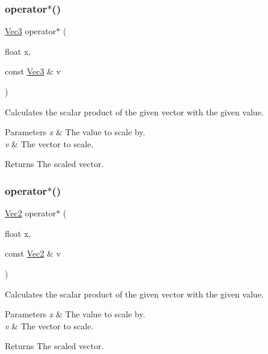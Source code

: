 \subsubsection{\texorpdfstring{operator$\ast$()}{operator*()}\hspace{0.1cm}{\footnotesize\ttfamily [2/5]}}
{\footnotesize\ttfamily \hyperlink{classVec3}{Vec3} operator$\ast$ (\begin{DoxyParamCaption}\item[{float}]{x,  }\item[{const \hyperlink{classVec3}{Vec3} \&}]{v }\end{DoxyParamCaption})\hspace{0.3cm}{\ttfamily [inline]}}

Calculates the scalar product of the given vector with the given value.


\begin{DoxyParams}{Parameters}
{\em x} & The value to scale by. \\
\hline
{\em v} & The vector to scale. \\
\hline
\end{DoxyParams}
\begin{DoxyReturn}{Returns}
The scaled vector. 
\end{DoxyReturn}
\mbox{\label{group__base_gafc4af4be488f74f130da5c2139d0f835}} 
\subsubsection{\texorpdfstring{operator$\ast$()}{operator*()}\hspace{0.1cm}{\footnotesize\ttfamily [3/5]}}
{\footnotesize\ttfamily \hyperlink{classVec2}{Vec2} operator$\ast$ (\begin{DoxyParamCaption}\item[{float}]{x,  }\item[{const \hyperlink{classVec2}{Vec2} \&}]{v }\end{DoxyParamCaption})\hspace{0.3cm}{\ttfamily [inline]}}

Calculates the scalar product of the given vector with the given value.


\begin{DoxyParams}{Parameters}
{\em x} & The value to scale by. \\
\hline
{\em v} & The vector to scale. \\
\hline
\end{DoxyParams}
\begin{DoxyReturn}{Returns}
The scaled vector. 
\end{DoxyReturn}
\mbox{\label{group__base_ga6fdf194e99104fc6a80db76368bd2bca}} 
